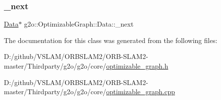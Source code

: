 \subsubsection{\texorpdfstring{\+\_\+next}{\_next}}
{\footnotesize\ttfamily \mbox{\hyperlink{classg2o_1_1_optimizable_graph_1_1_data}{Data}}$\ast$ g2o\+::\+Optimizable\+Graph\+::\+Data\+::\+\_\+next\hspace{0.3cm}{\ttfamily [protected]}}



The documentation for this class was generated from the following files\+:\begin{DoxyCompactItemize}
\item 
D\+:/github/\+V\+S\+L\+A\+M/\+O\+R\+B\+S\+L\+A\+M2/\+O\+R\+B-\/\+S\+L\+A\+M2-\/master/\+Thirdparty/g2o/g2o/core/\mbox{\hyperlink{optimizable__graph_8h}{optimizable\+\_\+graph.\+h}}\item 
D\+:/github/\+V\+S\+L\+A\+M/\+O\+R\+B\+S\+L\+A\+M2/\+O\+R\+B-\/\+S\+L\+A\+M2-\/master/\+Thirdparty/g2o/g2o/core/\mbox{\hyperlink{optimizable__graph_8cpp}{optimizable\+\_\+graph.\+cpp}}\end{DoxyCompactItemize}
